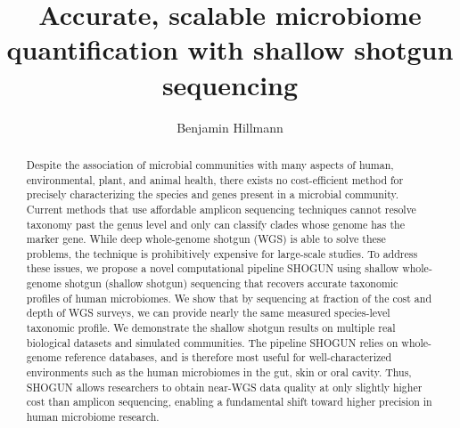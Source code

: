 \documentclass[manuscript, review=True]{acmart}
\begin{document}
\title{Accurate, scalable microbiome quantification with shallow shotgun sequencing}

\author{Benjamin Hillmann}


\renewcommand{\shortauthors}{Benjamin Hillmann}

\begin{abstract}
Despite the association of microbial communities with many aspects of human, environmental, plant, and animal health, there exists no cost-efficient method for precisely characterizing the species and genes present in a microbial community. Current methods that use affordable amplicon sequencing techniques cannot resolve taxonomy past the genus level and only can classify clades whose genome has the marker gene. While deep whole-genome shotgun (WGS) is able to solve these problems, the technique is prohibitively expensive for large-scale studies. To address these issues, we propose a novel computational pipeline SHOGUN using shallow whole-genome shotgun (shallow shotgun) sequencing that recovers accurate taxonomic profiles of human microbiomes. We show that by sequencing at fraction of the cost and depth of WGS surveys, we can provide nearly the same measured species-level taxonomic profile. We demonstrate the shallow shotgun results on multiple real biological datasets and simulated communities. The pipeline SHOGUN relies on whole-genome reference databases, and is therefore most useful for well-characterized environments such as the human microbiomes in the gut, skin or oral cavity. Thus, SHOGUN allows researchers to obtain near-WGS data quality at only slightly higher cost than amplicon sequencing, enabling a fundamental shift toward higher precision in human microbiome research.
\end{abstract}

%
%





\maketitle




\newpage



\newpage




\newpage


\end{document}
